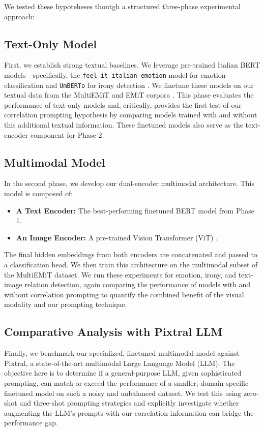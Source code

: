 \documentclass[letterpaper,journal]{IEEEtran}
\begin{document}
We tested these hypoteheses thoutgh a structured three-phase experimental approach:

\subsection{Text-Only Model}
First, we establish strong textual baselines. We leverage pre-trained Italian BERT models—specifically, the \texttt{feel-it-italian-emotion} model for emotion classification \cite{bianchi2021feel} and \texttt{UmBERTo} for irony detection \cite{musixmatch-2020-umberto}. We finetune these models on our textual data from the MultiEMiT and EMiT corpora \cite{emit}. This phase evaluates the performance of text-only models and, critically, provides the first test of our correlation prompting hypothesis by comparing models trained with and without this additional textual information. These finetuned models also serve as the text-encoder component for Phase 2.

\subsection{Multimodal Model}
In the second phase, we develop our dual-encoder multimodal architecture. This model is composed of:
\begin{itemize}
    \item \textbf{A Text Encoder:} The best-performing finetuned BERT model from Phase 1.
    \item \textbf{An Image Encoder:} A pre-trained Vision Transformer (ViT) \cite{dosovitskiy2021vit}.
\end{itemize}
The final hidden embeddings from both encoders are concatenated and passed to a classification head. We then train this architecture on the multimodal subset of the MultiEMiT dataset. We run these experiments for emotion, irony, and text-image relation detection, again comparing the performance of models with and without correlation prompting to quantify the combined benefit of the visual modality and our prompting technique.

\subsection{Comparative Analysis with Pixtral LLM}
Finally, we benchmark our specialized, finetuned multimodal model against Pixtral, a state-of-the-art multimodal Large Language Model (LLM). The objective here is to determine if a general-purpose LLM, given sophisticated prompting, can match or exceed the performance of a smaller, domain-specific finetuned model on such a noisy and unbalanced dataset. We test this using zero-shot and three-shot prompting strategies and explicitly investigate whether augmenting the LLM's prompts with our correlation information can bridge the performance gap.
\end{document}
